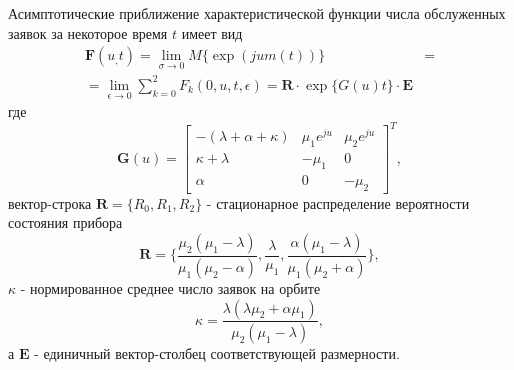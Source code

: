 \begin{theorem}
	Асимптотические приближение характеристической функции числа обслуженных заявок за некоторое время $t$ имеет вид
	\begin{equation*} \label{theorem_summary}
		\begin{split}
			\boldsymbol{F}(u_,t) =  \lim_{\sigma \xrightarrow{} 0} M\{\exp(jum(t))\} &= 
			\\
			= \lim_{\epsilon \xrightarrow{} 0} \sum_{k=0}^{2}F_{k}(0,u,t,\epsilon) = \boldsymbol{R} \cdot \exp\{G(u)t\} \cdot \boldsymbol{E}
		\end{split}
	\end{equation*}
	где 
	\begin{equation*}
		\boldsymbol{G}(u)=\begin{bmatrix}
			-(\lambda + \alpha + \kappa) & \mu_{1}e^{ju} &  \mu_{2}e^{ju}\\
			\kappa+\lambda & -\mu_{1} & 0\\
			\alpha & 	0 &	-\mu_{2}
		\end{bmatrix}^{T},
	\end{equation*}
	вектор-строка $\boldsymbol{R}=\{R_{0},R_{1},R_{2}\}$ - стационарное распределение вероятности состояния прибора
	\begin{equation*}
		\boldsymbol{R}=\{\frac{\mu_{2}(\mu_{1} - \lambda)}{\mu_{1}(\mu_{2} - \alpha)},\frac{\lambda}{\mu_{1}},\frac{\alpha(\mu_{1} - \lambda)}{\mu_{1}(\mu_{2} + \alpha)}\},
	\end{equation*}
	$\kappa$ - нормированное среднее число заявок на орбите
	\begin{equation*}
		\kappa = \frac{\lambda(\lambda \mu_{2} + \alpha \mu_{1})}{\mu_{2}(\mu_{1} - \lambda)},
	\end{equation*}
	а $\boldsymbol{E}$ - единичный вектор-столбец соответствующей размерности.
\end{theorem}
